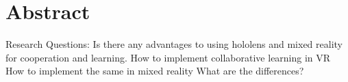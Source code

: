 \chapter*{Abstract}
Research Questions: 
Is there any advantages to using hololens and mixed reality for cooperation and learning.
How to implement collaborative learning in VR
How to implement the same in mixed reality
What are the differences?


\hypersetup{pageanchor=false}
